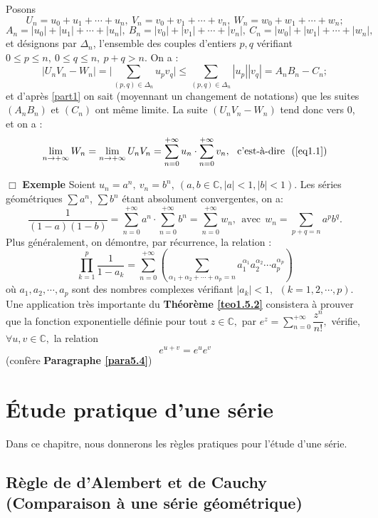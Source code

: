 \documentclass[11pt, a4paper]{book}
\newenvironment{pr}{\noindent {\bf Preuve} \noindent} {\hfill $\Box$\vskip 5mm}
\begin{document}
\begin{pr}
\begin{enumerate}
Posons $$ U_n=u_0+u_1+\cdots+u_n,~V_n=v_0+v_1+\cdots+v_n,~W_n=w_0+w_1+\cdots+w_n;$$ $$ A_n=|u_0|+|u_1|+\cdots+|u_n|,~B_n=|v_0|+|v_1|+\cdots+|v_n|, ~C_n=|w_0|+|w_1|+\cdots+|w_n|,$$ 
et d\'esignons par $\Delta_n$, l'ensemble des couples d'entiers $p,q$ 
v\'erifiant $0\leq p\leq n,~ 0\leq q\leq n,~ p+q>n.$ 
On a : $$|U_nV_n-W_n|=\Big|\sum_{(p,q)\in \Delta_n} u_p v_q\Big|\leq \sum_{(p,q)\in \Delta_n}|u_p||v_q|=A_nB_n-C_n;$$ et d'apr\`es \ref{part1} on sait (moyennant un changement de notations) que les suites $(A_nB_n)$ et $(C_n)$ ont m\^eme limite. La suite $(U_nV_n-W_n)$ tend donc vers $0$, et on a : $$\lim_{n\rightarrow+\infty}W_n=\lim_{n\rightarrow+\infty}U_nV_n=\sum_{n=0}^{+\infty}u_n \cdot \sum_{n=0}^{+\infty}v_n,~~\text{c'est-\`a-dire}~~(\ref{eq1.1})$$
\end{enumerate}
\end{pr}
\textbf{Exemple}\quad
Soient $u_n=a^n,~v_n=b^n,~(a,b\in \mathbb{C},|a|<1,|b|<1)$. Les s\'eries g\'eom\'etriques $\sum a^n$, $\sum b^n$ \'etant absolument convergentes, on a: $$\dfrac{1}{(1-a)(1-b)}=\sum_{n=0}^{+\infty}a^n\cdot \sum_{n=0}^{+\infty}b^n=\sum_{n=0}^{+\infty} w_n,~~\text{avec}~~w_n=\sum_{p+q=n}a^pb^q.$$
Plus g\'en\'eralement, on d\'emontre, par r\'ecurrence, la relation :$$\prod_{k=1}^p\dfrac{1}{1-a_k}=\sum_{n=0}^{+\infty}\left(\sum_{\alpha_1+\alpha_2+\cdots+\alpha_p=n}a_1^{\alpha_1}a_2^{\alpha_2}\cdots a_p^{\alpha_p}\right)$$ o\`u $a_1,a_2,\cdots,a_p$ sont des nombres complexes v\'erifiant $|a_k|<1,~~(k=1,2,\cdots,p).$\\
Une application tr\`es importante du \textbf{Th\'eor\`eme \ref{teo1.5.2}} consistera \`a prouver que la fonction exponentielle d\'efinie pour tout $z\in \mathbb{C},$ par ${\displaystyle e^z=\sum_{n=0}^{+\infty}\dfrac{z^n}{n!}},$ v\'erifie, $\forall u,v\in \mathbb{C},$ la relation $$e^{u+v}=e^u e^v$$ (conf\`ere \textbf{Paragraphe \ref{para5.4}})


\chapter{\'Etude pratique d'une s\'erie}
Dans ce chapitre, nous donnerons les r\`egles pratiques pour l'\'etude d'une s\'erie.

\section[R\`egle de d'Alembert et de Cauchy]{R\`egle de d'Alembert et de Cauchy (Comparaison \`a une s\'erie g\'eom\'etrique)}
\end{document}
